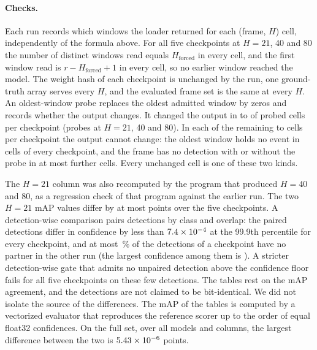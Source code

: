 \documentclass[10pt,twocolumn,letterpaper]{article}
\begin{document}
\paragraph{Checks.}
Each run records which windows the loader returned for each (frame, $H$) cell, independently of the formula above. For all five checkpoints at $H=21$, 40 and 80 the number of distinct windows read equals $H_{\mathrm{forced}}$ in every cell, and the first window read is $r-H_{\mathrm{forced}}+1$ in every cell, so no earlier window reached the model. The weight hash of each checkpoint is unchanged by the run, one ground-truth array serves every $H$, and the evaluated frame set is the same at every $H$. An oldest-window probe replaces the oldest admitted window by zeros and records whether the output changes. It changed the output in \lhProbeHitLo{} to \lhProbeHitHi{} of \lhProbeN{} probed cells per checkpoint (probes at $H=21$, 40 and 80). In each of the remaining \lhProbeMissLo{} to \lhProbeMissHi{} cells per checkpoint the output cannot change: the oldest window holds no event in \lhProbeEmptyMax{} cells of every checkpoint, and the frame has no detection with or without the probe in at most \lhProbeNoDetMax{} further cells. Every unchanged cell is one of these two kinds.

The $H=21$ column was also recomputed by the program that produced $H=40$ and 80, as a regression check of that program against the earlier run. The two $H=21$ mAP values differ by at most \lhHTwentyoneDiff{} points over the five checkpoints. A detection-wise comparison pairs detections by class and overlap: the paired detections differ in confidence by less than $7.4\times10^{-4}$ at the 99.9th percentile for every checkpoint, and at most \lhDetUnpairPct\,\% of the detections of a checkpoint have no partner in the other run (the largest confidence among them is \lhDetUnpairScore). A stricter detection-wise gate that admits no unpaired detection above the confidence floor fails for all five checkpoints on these few detections. The tables rest on the mAP agreement, and the detections are not claimed to be bit-identical. We did not isolate the source of the differences. The mAP of the tables is computed by a vectorized evaluator that reproduces the reference scorer up to the order of equal float32 confidences. On the full set, over all models and columns, the largest difference between the two is $5.43\times10^{-6}$ points.
\end{document}
